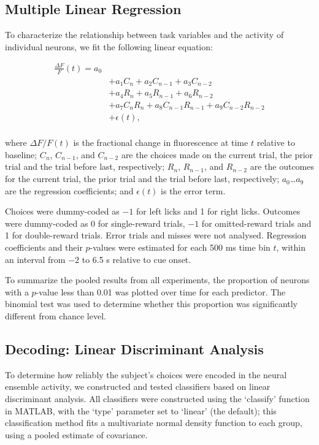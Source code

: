 \subsection*{Multiple Linear Regression}
To characterize the relationship between task variables and the activity of individual neurons, we fit the following linear equation:

\begin{equation*}
\begin{split}
\frac{\Delta F}{F}(t) = a_0 \\
&+ a_1 C_{n}        + a_2 C_{n-1}       + a_3 C_{n-2} \\
&+ a_4 R_{n}        + a_5 R_{n-1}       + a_6 R_{n-2} \\ 
&+ a_{7}C_{n}R_{n}  + a_8C_{n-1}R_{n-1} + a_9C_{n-2}R_{n-2} \\ 
&+ \epsilon(t),\\
\end{split} 
\end{equation*}

\noindent where $\Delta F/F(t)$ is the fractional change in fluorescence at time $t$ relative to baseline; $C_{n}$, $C_{n-1}$, and $C_{n-2}$ are the choices made on the current trial, the prior trial and the trial before last, respectively; $R_{n}$, $R_{n-1}$, and $R_{n-2}$ are the outcomes for the current trial, the prior trial and the trial before last, respectively; $a_0$…$a_9$ are the regression coefficients; and $\epsilon (t)$ is the error term. 

Choices were dummy-coded as $-1$ for left licks and 1 for right licks. Outcomes were dummy-coded as 0 for single-reward trials, $-1$ for omitted-reward trials and 1 for double-reward trials. Error trials and misses were not analysed. Regression coefficients and their $p$-values were estimated for each 500 ms time bin $t$, within an interval from $-2$ to 6.5 s relative to cue onset. 

To summarize the pooled results from all experiments, the proportion of neurons with a $p$-value less than 0.01 was plotted over time for each predictor. The binomial test was used to determine whether this proportion was significantly different from chance level.

\subsection*{Decoding: Linear Discriminant Analysis}
To determine how reliably the subject’s choices were encoded in the neural ensemble activity, we constructed and tested classifiers based on linear discriminant analysis. All classifiers were constructed using the ‘classify’ function in MATLAB, with the ‘type’ parameter set to ‘linear’ (the default); this classification method fits a multivariate normal density function to each group, using a pooled estimate of covariance. 

